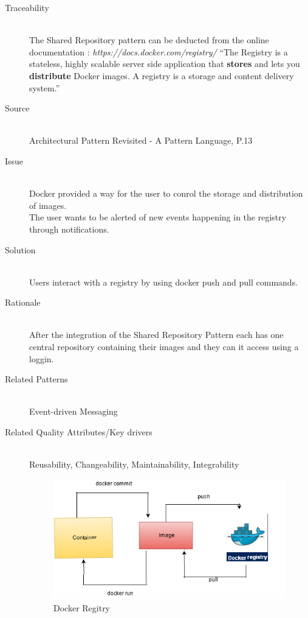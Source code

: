 \begin{description}
\item[Traceability]~\\
The Shared Repository pattern can be deducted from the online documentation : \textit{https://docs.docker.com/registry/} ``The Registry is a stateless, highly scalable server side application that \textbf{stores} and lets you \textbf{distribute} Docker images. A registry is a storage and content delivery system.''


\item[Source]~\\
Architectural Pattern Revisited - A Pattern Language, P.13 \cite{avgeriou2005architectural}

\item[Issue]~\\
Docker provided a way for the user to conrol the storage and distribution of images. \\
The user wants to be alerted of new events happening in the registry through notifications. %


\item[Solution]~\\ %
Users interact with a registry by using docker push and pull commands.

\item[Rationale]~\\ %
 After the integration of the Shared Repository Pattern each has one central repository containing their images and they can it access using a loggin. \\

\item [Related Patterns]~\\
Event-driven Messaging

\item [Related Quality Attributes/Key drivers]~\\
Reusability, Changeability, Maintainability, Integrability

 \begin{figure}[H]
 \centering
 \includegraphics[scale=0.7]{images/Dockerrep.png}
 \caption{Docker Regitry}
 \label{fig:docker-registry}
 \end{figure}


\end{description}
